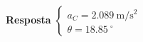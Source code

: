 \begin{flushright}
	\textbf{Resposta}
	$
	\begin{cases}	
	a_{C}=\SI{2.089}{\meter/\second^{2}}\\
	\theta=\SI{18.85}{^{\circ}}
	\end{cases}
	$
\end{flushright}